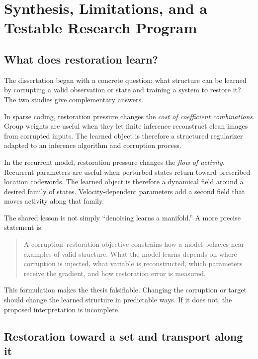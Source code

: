 \chapter{Synthesis, Limitations, and a Testable Research Program}
\label{chap:synthesis}

\section{What does restoration learn?}
\label{sec:synthesis-answer}

The dissertation began with a concrete question: what structure can be learned by corrupting a valid observation or state and training a system to restore it? The two studies give complementary answers.

In sparse coding, restoration pressure changes the \emph{cost of coefficient combinations}. Group weights are useful when they let finite inference reconstruct clean images from corrupted inputs. The learned object is therefore a structured regularizer adapted to an inference algorithm and corruption process.

In the recurrent model, restoration pressure changes the \emph{flow of activity}. Recurrent parameters are useful when perturbed states return toward prescribed location codewords. The learned object is therefore a dynamical field around a desired family of states. Velocity-dependent parameters add a second field that moves activity along that family.

The shared lesson is not simply ``denoising learns a manifold.'' A more precise statement is:

\begin{quote}
A corruption--restoration objective constrains how a model behaves near examples of valid structure. What the model learns depends on where corruption is injected, what variable is reconstructed, which parameters receive the gradient, and how restoration error is measured.
\end{quote}

This formulation makes the thesis falsifiable. Changing the corruption or target should change the learned structure in predictable ways. If it does not, the proposed interpretation is incomplete.

\section{Restoration toward a set and transport along it}
\label{sec:synthesis-geometry}

